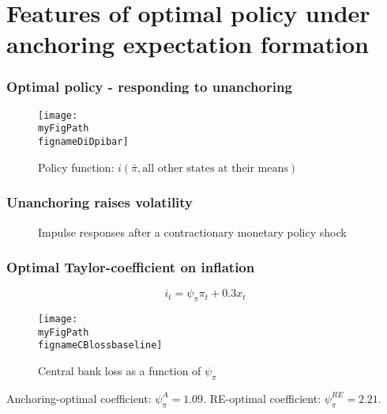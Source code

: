 \documentclass[10pt]{beamer}
\def \myFigPath {../../../figures/}
\def\mySmallFigScale{0.25}
\def\fignameDiDpibar{analyze_opt_policy_ip12_Sep_2020}
\def\fignameCBlossbaseline{plot_sim_loss_approx_pretty_losses_again_critsmooth_constant_only_pi_only_lamx0_05_lami0_2020_09_12}
\def\fignameIRFanchored{RIR_anch_psi_pi1_5_command_IRFs_approx_pretty_2020_09_12}
\def\fignameIRFunanchored{RIR_unanch_psi_pi1_5_command_IRFs_approx_pretty_2020_09_12}
\begin{document}
\section{Features of optimal policy under anchoring expectation formation}


\begin{frame}
	\frametitle{Optimal policy - responding to unanchoring }
	
\begin{figure}[h!]
\texttt{[image: \\myFigPath \\fignameDiDpibar]}
\caption{Policy function: $i(\bar{\pi}, \text{all other states at their means})$}
\end{figure} 

\end{frame}


\begin{frame}
	\frametitle{Unanchoring raises volatility}

\begin{figure}[h!]
\caption{Impulse responses after a contractionary monetary policy shock}
\label{IRF}
\end{figure}	

\end{frame}



\begin{frame}
	\frametitle{Optimal Taylor-coefficient on inflation}

	\begin{equation}
	i_t = \psi_{\pi}\pi_t + 0.3 x_t
	\end{equation}

	
\begin{figure}[h!]
\caption{Central bank loss as a function of $\psi_{\pi}$}
\texttt{[image: \\myFigPath \\fignameCBlossbaseline]}
\end{figure} 

\begin{small}
Anchoring-optimal coefficient: $\psi_{\pi}^A =1.09$. RE-optimal coefficient: $\psi_{\pi}^{RE} =2.21$.
\end{small}

\end{frame}
\end{document}
